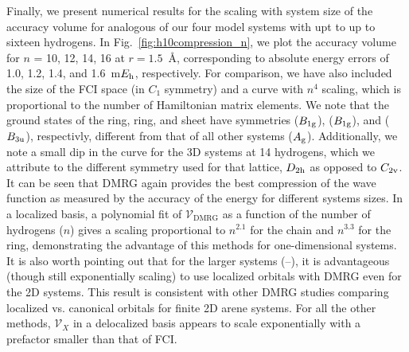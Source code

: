 \documentclass[aip,jcp,amsmath,amssymb, reprint]{revtex4-1}
\newcommand*{\Eh}{$E_{\rm h}$\xspace}
\begin{document}
Finally, we present numerical results for the scaling with system size of the accuracy volume for analogous of our four model systems with upt to up to sixteen hydrogens.
In Fig.~\ref{fig:h10compression_n}, we plot the accuracy volume for $n$ = 10, 12, 14, 16 at $r=1.5$~{\AA}, corresponding to absolute energy errors of 1.0, 1.2, 1.4, and 1.6~m\Eh, respectively.
For comparison, we have also included the size of the FCI space (in $C_1$ symmetry) and a curve with $n^4$ scaling, which is proportional to the number of Hamiltonian matrix elements.
We note that the ground states of the  ring,  ring, and  sheet have symmetries ($B_{1\rm g}$), ($B_{1\rm g}$), and ($B_{3\rm u}$), respectivly, different from that of all other systems ($A_{\rm g}$).
Additionally, we note a small dip in the curve for the 3D systems at 14 hydrogens, which we attribute to the different symmetry used for that lattice, $D_{2\rm h}$ as opposed to $C_{2\rm v}$.
It can be seen that DMRG again provides the best compression of the wave function as measured by the accuracy of the energy for different systems sizes.
In a localized basis, a polynomial fit of $\mathcal{V}_\text{DMRG}$  as a function of the number of hydrogens ($n$) gives a scaling proportional to $n^{2.1}$ for the chain and $n^{3.3}$ for the ring, demonstrating the advantage of this methods for one-dimensional systems.
It is also worth pointing out that for the larger systems (--), it is advantageous (though still exponentially scaling) to use localized orbitals with DMRG even for the 2D systems. This result is consistent with other DMRG studies comparing localized vs. canonical orbitals for finite 2D arene systems.\cite{Olivares2015TheAbinitio}
For all the other methods, $\mathcal{V}_{X}$ in a delocalized basis appears to scale exponentially with a prefactor smaller than that of FCI.
\end{document}
